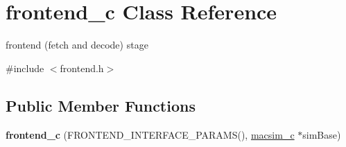 \hypertarget{classfrontend__c}{
\section{frontend\_\-c Class Reference}
\label{classfrontend__c}
}


frontend (fetch and decode) stage  




{\ttfamily \#include $<$frontend.h$>$}

\subsection*{Public Member Functions}
\begin{DoxyCompactItemize}
\item 
\hypertarget{classfrontend__c_a59df749752c55785b6709098430f0148}{
{\bfseries frontend\_\-c} (FRONTEND\_\-INTERFACE\_\-PARAMS(), \hyperlink{classmacsim__c}{macsim\_\-c} $\ast$simBase)}
\label{classfrontend__c_a59df749752c55785b6709098430f0148}


\end{DoxyCompactItemize}
